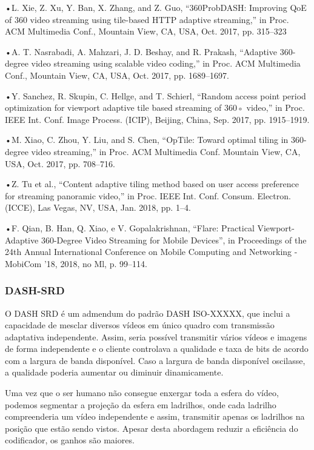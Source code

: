 •L. Xie, Z. Xu, Y. Ban, X. Zhang, and Z. Guo, “360ProbDASH: Improving QoE of 360 video streaming using tile-based HTTP adaptive streaming,” in Proc. ACM Multimedia Conf., Mountain View, CA, USA, Oct. 2017, pp. 315–323

•A. T. Nasrabadi, A. Mahzari, J. D. Beshay, and R. Prakash, “Adaptive 360-degree video streaming using scalable video coding,” in Proc. ACM Multimedia Conf., Mountain View, CA, USA, Oct. 2017, pp. 1689–1697.

•Y. Sanchez, R. Skupin, C. Hellge, and T. Schierl, “Random access point period optimization for viewport adaptive tile based streaming of 360◦ video,” in Proc. IEEE Int. Conf. Image Process. (ICIP), Beijing, China, Sep. 2017, pp. 1915–1919.

•M. Xiao, C. Zhou, Y. Liu, and S. Chen, “OpTile: Toward optimal tiling in 360-degree video streaming,” in Proc. ACM Multimedia Conf. Mountain View, CA, USA, Oct. 2017, pp. 708–716.

•Z. Tu et al., “Content adaptive tiling method based on user access preference for streaming panoramic video,” in Proc. IEEE Int. Conf. Consum. Electron. (ICCE), Las Vegas, NV, USA, Jan. 2018, pp. 1–4.

•F. Qian, B. Han, Q. Xiao, e V. Gopalakrishnan, “Flare: Practical Viewport-Adaptive 360-Degree Video Streaming for Mobile Devices”, in Proceedings of the 24th Annual International Conference on Mobile Computing and Networking - MobiCom ’18, 2018, no Ml, p. 99–114.

\subsubsection{DASH-SRD}
O DASH SRD é um admendum do padrão DASH ISO-XXXXX, que inclui a capacidade de mesclar diversos vídeos em único quadro com transmissão adaptativa independente. Assim, seria possível transmitir vários vídeos e imagens de forma independente e o cliente controlava a qualidade e taxa de bits de acordo com a largura de banda disponível. Caso a largura de banda disponível oscilasse, a qualidade poderia aumentar ou diminuir dinamicamente.

Uma vez que o ser humano não consegue enxergar toda a esfera do vídeo, podemos segmentar a projeção da esfera em ladrilhos, onde cada ladrilho compreenderia um vídeo independente e assim, transmitir apenas os ladrilhos na posição que estão sendo vistos. Apesar desta abordagem reduzir a eficiência do codificador, os ganhos são maiores.


